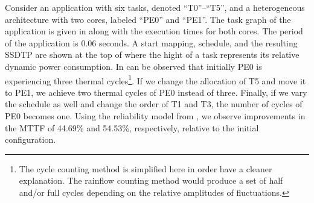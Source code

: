 Consider an application with six tasks, denoted ``T0''--``T5'', and a heterogeneous architecture with two cores, labeled ``PE0'' and ``PE1''. The task graph of the application is given in  along with the execution times for both cores. The period of the application is 0.06 seconds. A start mapping, schedule, and the resulting SSDTP are shown at the top of  where the hight of a task represents its relative dynamic power consumption. In can be observed that initially PE0 is experiencing three thermal cycles\footnote{The cycle counting method is simplified here in order have a cleaner explanation. The rainflow counting method \cite{xiang2010} would produce a set of half and/or full cycles depending on the relative amplitudes of fluctuations.}. If we change the allocation of T5 and move it to PE1, we achieve two thermal cycles of PE0 instead of three. Finally, if we vary the schedule as well and change the order of T1 and T3, the number of cycles of PE0 becomes one. Using the reliability model from , we observe improvements in the MTTF of 44.69\% and 54.53\%, respectively, relative to the initial configuration.
